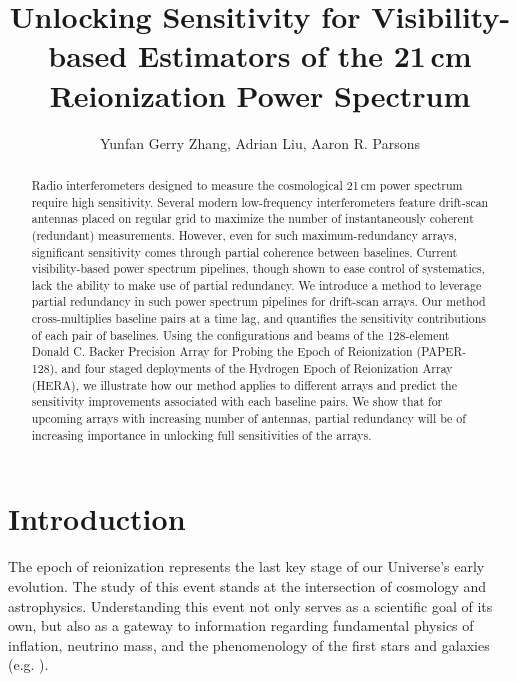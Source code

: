 \documentclass[twocolumn,apj,numberedappendix]{emulateapj}
\renewcommand\[{\begin{equation}}
\renewcommand\]{\end{equation}}
\begin{document}
\title{Unlocking Sensitivity for Visibility-based Estimators of the 21\,cm Reionization Power Spectrum}

\author{
Yunfan Gerry Zhang,
Adrian Liu,
Aaron R. Parsons
}

\begin{abstract}
Radio interferometers designed to measure the cosmological 21\,cm power spectrum require high sensitivity. Several modern low-frequency interferometers feature drift-scan antennas placed on regular grid to maximize the number of instantaneously coherent (redundant) measurements. However, even for such maximum-redundancy arrays, significant sensitivity comes through partial coherence between baselines. Current visibility-based power spectrum pipelines, though shown to ease control of systematics, lack the ability to make use of partial redundancy. We introduce a method to leverage partial redundancy in such power spectrum pipelines for drift-scan arrays. Our method cross-multiplies baseline pairs at a time lag, and quantifies the sensitivity contributions of each pair of baselines. 
Using the configurations and beams of the 128-element Donald C. Backer Precision Array for Probing the Epoch of Reionization (PAPER-128), and four staged deployments of the Hydrogen Epoch of Reionization Array (HERA), we illustrate how our method applies to different arrays and predict the sensitivity improvements associated with each baseline pairs. We show that for upcoming arrays with increasing number of antennas, partial redundancy will be of increasing importance in unlocking full sensitivities of the arrays. 
\end{abstract}

\section{Introduction}

The epoch of reionization represents the last key
stage of our Universe's early evolution. The study of this event stands at
the intersection of cosmology and astrophysics. Understanding this
event not only serves as a scientific goal
of its own, but also as a gateway to information
regarding fundamental physics of inflation, neutrino mass, and the phenomenology
of the first stars and galaxies (e.g. \citealt{LiuOpticalDepth, Liu2016b, Mao2008, DEw21cm, Bull2015, Oyama20131186}). 
\end{document}
